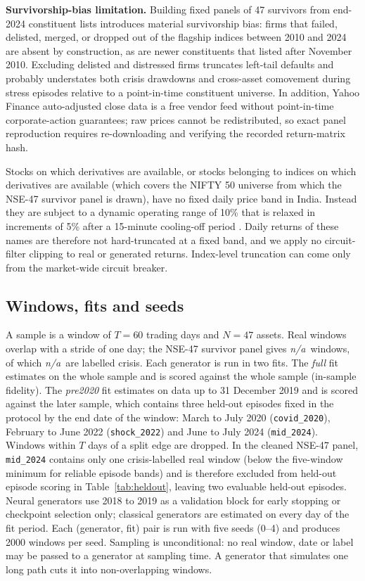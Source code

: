 \documentclass[journal]{IEEEtran}
\newcommand{\pendingnum}{\textit{n/a}}
\providecommand{\realNseWindows}{\pendingnum}
\providecommand{\realNseCrisis}{\pendingnum}
\begin{document}
\textbf{Survivorship-bias limitation.} Building fixed panels of 47 survivors from end-2024 constituent lists
introduces material survivorship bias: firms that failed, delisted, merged, or dropped out of the flagship
indices between 2010 and 2024 are absent by construction, as are newer constituents that listed after
November 2010. Excluding delisted and distressed firms truncates left-tail defaults and probably understates
both crisis drawdowns and cross-asset comovement during stress episodes relative to a point-in-time
constituent universe. In addition, Yahoo Finance auto-adjusted close data is a free vendor feed without
point-in-time corporate-action guarantees; raw prices cannot be redistributed, so exact panel reproduction
requires re-downloading and verifying the recorded return-matrix hash.

Stocks on which derivatives are available, or stocks belonging to indices on which derivatives are available
(which covers the NIFTY 50 universe from which the NSE-47 survivor panel is drawn), have no fixed daily price
band in India. Instead they are subject to a dynamic operating range of 10\% that is relaxed in increments of
5\% after a 15-minute cooling-off period \cite{sebi2023tradingchapter}. Daily returns of these names are
therefore not hard-truncated at a fixed band, and we apply no circuit-filter clipping to real or generated
returns. Index-level truncation can come only from the market-wide circuit breaker.

\subsection{Windows, fits and seeds}
A sample is a window of $T=60$ trading days and $N=47$ assets. Real windows overlap with a stride of one day;
the NSE-47 survivor panel gives \realNseWindows\ windows, of which \realNseCrisis\ are labelled crisis. Each
generator is run in two fits. The \emph{full} fit estimates on the whole sample and is scored against the whole
sample (in-sample fidelity). The \emph{pre2020} fit estimates on data up to 31 December 2019 and is scored
against the later sample, which contains three held-out episodes fixed in the protocol by the end date of the
window: March to July 2020 (\texttt{covid\_2020}), February to June 2022 (\texttt{shock\_2022}) and June to
July 2024 (\texttt{mid\_2024}). Windows within $T$ days of a split edge are dropped. In the cleaned NSE-47
panel, \texttt{mid\_2024} contains only one crisis-labelled real window (below the five-window minimum for
reliable episode bands) and is therefore excluded from held-out episode scoring in Table~\ref{tab:heldout},
leaving two evaluable held-out episodes. Neural generators use 2018 to 2019 as a validation block for early
stopping or checkpoint selection only; classical generators are estimated on every day of the fit period. Each
(generator, fit) pair is run with five seeds (0--4) and produces 2000 windows per seed. Sampling is
unconditional: no real window, date or label may be passed to a generator at sampling time. A generator that
simulates one long path cuts it into non-overlapping windows.
\end{document}
